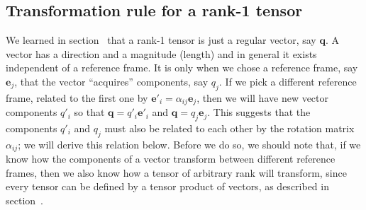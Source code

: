 \subsection{Transformation rule for a rank-1 tensor}
We learned in section~ that a rank-1 tensor is just a regular vector, say $\mathbf{q}$.  A vector has a direction and a magnitude (length) and in general it exists independent of a reference frame.  It is only when we chose a reference frame, say $\mathbf{e}_j$, that the vector ``acquires'' components, say $q_j$. If we pick a different reference frame, related to the first one by $\mathbf{e}'_i = \alpha_{ij}\mathbf{e}_j$, then we will have new vector components $q'_i$ so that $\mathbf{q}=q'_i \mathbf{e}'_i$ and $\mathbf{q}=q_j \mathbf{e}_j$. This suggests that the components $q'_i$ and $q_j$ must also be related to each other by the rotation matrix $\alpha_{ij}$; we will derive this relation below. Before we do so, we should note that, if we know how the components of a vector transform between different reference frames, then we also know how a tensor of arbitrary rank will transform, since every tensor can be defined by a tensor product of vectors, as described in section~.

